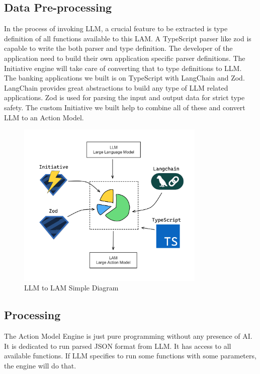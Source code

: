 \clearpage

\subsection{Data Pre-processing}

In the process of invoking LLM, a crucial feature to be extracted is type definition of all functions available to this LAM. A TypeScript parser like zod is capable to write the both parser and type definition. The developer of the application need to build their own application specific parser definitions. The Initiative engine will take care of converting that to type definitions to LLM.\\  

The banking applications we built is on TypeScript with LangChain and Zod. LangChain provides great abstractions to build any type of LLM related applications. Zod is used for parsing the input and output data for strict type safety. The custom Initiative we built help to combine all of these and convert LLM to an Action Model.

\begin{figure}[h!]
    \centering
    \includegraphics[width=0.8\textwidth]{Images/Block_Diag/LLM-to-LAM.png}
    \caption{LLM to LAM Simple Diagram}
\end{figure}

\clearpage

\subsection{Processing}

\noindent The Action Model Engine is just pure programming without any presence of AI. It is dedicated to run parsed JSON format from LLM. It has access to all available functions. If LLM specifies to run some functions with some parameters, the engine will do that.

